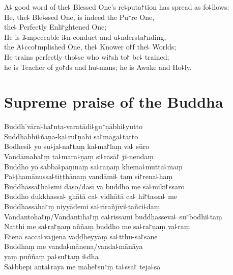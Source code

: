 \begin{leader}
\end{leader}

A꜕ good word of the꜕ Blessed One's re꜕puta꜓tion has spread as fo꜕llows:\\
He, the꜕ Ble꜕ssed One, is indeed the Pu꜓re One,\\
\vin the꜕ Perfectly Enli꜓ghtened One;\\
He is i꜕mpeccable i꜕n conduct and u꜕ndersta꜓nding,\\
\vin the A꜕cco꜓mplished One, the꜕ Knower o꜓f the꜕ Worlds;\\
He trains perfectly tho꜕se who wi꜓sh to꜓ be꜕ trained;\\
\vin he is Teacher of go꜓ds and hu꜕mans; he is Awake and Ho꜕ly.

\clearpage

\chapter{Supreme praise of the Buddha}%

\begin{leader}
\end{leader}

Buddh'vāra꜕ha꜓nta-varatādi꜕gu꜓ṇābhi꜕yutto\\
Suddhābhi꜕ñāṇa-ka꜕ru꜓ṇāhi sa꜓māga꜕tatto\\
Bodhesi꜕ yo su꜕ja꜕na꜓taṃ ka꜕ma꜓laṃ va꜕ sūro\\
Vandāmaha꜓ṃ ta꜕mara꜕ṇaṃ si꜕rasā꜓ ji꜕nendaṃ\\
Buddho yo sabba꜕pāṇīnaṃ sa꜕raṇaṃ khema꜕mutta꜕maṃ\\
Pa꜕ṭhamānussa꜕tiṭṭhānaṃ vandāmi꜕ taṃ si꜓rena꜕haṃ\\
Buddhassā꜓ha꜕smi dāso/dāsī va buddho me sā꜕miki꜓ssaro\\
Buddho dukkhassa꜕ ghātā ca꜕ vidhātā ca꜕ hi꜓tassa꜕ me\\
Buddhassāha꜓ṃ niyyādemi sa꜕rīrañjīvi꜕tañci꜕daṃ\\
Vandantoha꜓ṃ/Vandantīha꜓ṃ ca꜕rissāmi buddhasseva꜕ su꜓bodhi꜕taṃ\\
Natthi me sa꜕ra꜓ṇaṃ aññaṃ buddho me sa꜕ra꜓ṇaṃ va꜕raṃ\\
Etena sacca꜕vajjena vaḍḍheyyaṃ sa꜕tthu-sā꜓sane\\
Buddhaṃ me vanda꜕mānena/vanda꜕mānāya\\
\vin yaṃ puññaṃ pa꜕su꜓taṃ i꜕dha\\
Sa꜕bbepi anta꜕rāyā me māhe꜓su꜓ṃ ta꜕ssa꜓ teja꜕sā

